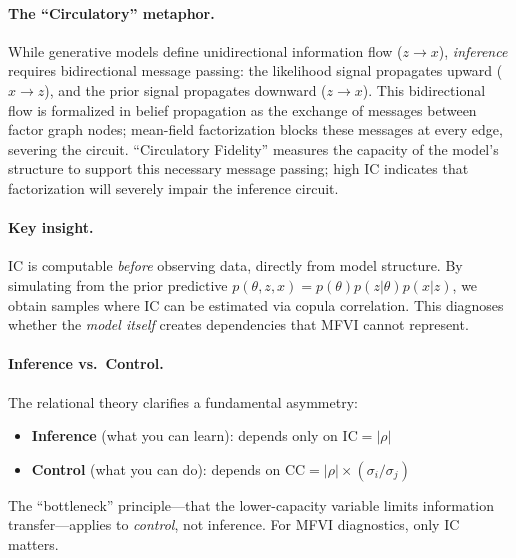 \documentclass[10pt]{article} %
\theoremstyle{plain}
\theoremstyle{definition}
\newcommand{\IC}{\mathrm{IC}}  %
\newcommand{\CC}{\mathrm{CC}}  %
\begin{document}
\paragraph{The ``Circulatory'' metaphor.} While generative models define unidirectional information flow ($z \to x$), \emph{inference} requires bidirectional message passing: the likelihood signal propagates upward ($x \to z$), and the prior signal propagates downward ($z \to x$). This bidirectional flow is formalized in belief propagation as the exchange of messages between factor graph nodes; mean-field factorization blocks these messages at every edge, severing the circuit. ``Circulatory Fidelity'' measures the capacity of the model's structure to support this necessary message passing; high IC indicates that factorization will severely impair the inference circuit.

\paragraph{Key insight.} IC is computable \emph{before} observing data, directly from model structure. By simulating from the prior predictive $p(\theta, z, x) = p(\theta)p(z|\theta)p(x|z)$, we obtain samples where IC can be estimated via copula correlation. This diagnoses whether the \emph{model itself} creates dependencies that MFVI cannot represent.

\paragraph{Inference vs.\ Control.} The relational theory clarifies a fundamental asymmetry:
\begin{itemize}
    \item \textbf{Inference} (what you can learn): depends only on $\IC = |\rho|$
    \item \textbf{Control} (what you can do): depends on $\CC = |\rho| \times (\sigma_i / \sigma_j)$
\end{itemize}
The ``bottleneck'' principle---that the lower-capacity variable limits information transfer---applies to \emph{control}, not inference. For MFVI diagnostics, only IC matters.
\end{document}
